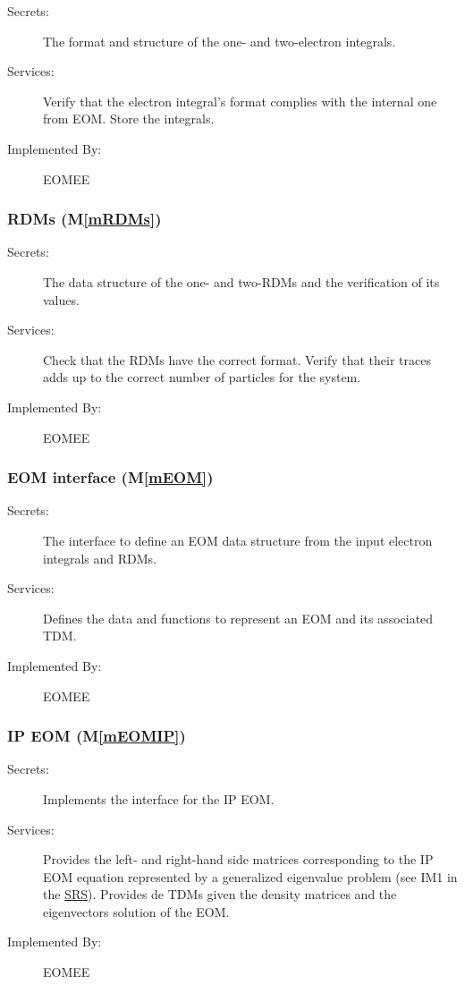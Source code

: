 \documentclass[12pt, titlepage]{article}
\newcommand{\mref}[1]{M\ref{#1}}
\begin{document}
\begin{description}
	\item[Secrets:]The format and structure of the one- and two-electron 
	integrals.
	\item[Services:] Verify that the electron integral's format complies with 
	the internal one from EOM. Store the integrals.
	\item[Implemented By:] EOMEE
\end{description}

\subsubsection{RDMs (\mref{mRDMs})}

\begin{description}
	\item[Secrets:]The data structure of the one- and two-RDMs and the 
	verification of its values.
	\item[Services:] Check that the RDMs have the correct format. Verify that 
	their traces adds up to the correct number of particles for the system.
	\item[Implemented By:] EOMEE
\end{description}

\subsubsection{EOM interface (\mref{mEOM})}

\begin{description}
	\item[Secrets:] The interface to define an EOM data structure from the 
	input electron integrals and RDMs.
	\item[Services:] Defines the data and functions to represent an EOM and 
	its associated TDM.
	\item[Implemented By:] EOMEE
\end{description}

\subsubsection{IP EOM (\mref{mEOMIP})}

\begin{description}
	\item[Secrets:] Implements the interface for the IP EOM.
	\item[Services:] Provides the left- and right-hand side matrices 
	corresponding to the IP EOM equation represented by a generalized 
	eigenvalue problem (see IM1 in the 
	\href{https://github.com/gabrielasd/eomee/tree/cas741/docs/SRS/}{SRS}). 
	Provides 
	de TDMs given the density matrices and the 
	eigenvectors solution of the EOM.
	\item[Implemented By:] EOMEE
\end{description}
\end{document}
